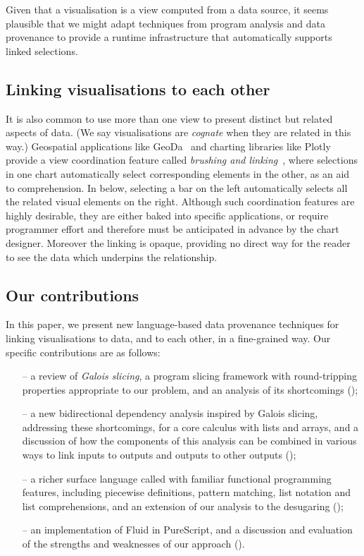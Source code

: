 Given that a visualisation is a view computed from a data source, it seems plausible that we might adapt techniques from program analysis and data provenance to provide a runtime infrastructure that automatically supports linked selections.

\subsection{Linking visualisations to each other}

It is also common to use more than one view to present distinct but related aspects of data. (We say visualisations are \emph{cognate} when they are related in this way.) Geospatial applications like GeoDa~\cite{anselin06} and charting libraries like Plotly provide a view coordination feature called \emph{brushing and linking}~\cite{becker87}, where selections in one chart automatically select corresponding elements in the other, as an aid to comprehension. In  below, selecting a bar on the left automatically selects all the related visual elements on the right. Although such coordination features are highly desirable, they are either baked into specific applications, or require programmer effort and therefore must be anticipated in advance by the chart designer. Moreover the linking is opaque, providing no direct way for the reader to see the data which underpins the relationship.

\subsection{Our contributions}

In this paper, we present new language-based data provenance techniques for linking visualisations to data, and to each other, in a fine-grained way. Our specific contributions are as follows:

\begin{itemize}[leftmargin=*]
   \item[--] a review of \emph{Galois slicing}, a program slicing framework with round-tripping properties appropriate to our problem, and an analysis of its shortcomings ();
   \item[--] a new bidirectional dependency analysis inspired by Galois slicing, addressing these shortcomings, for a core calculus with lists and arrays, and a discussion of how the components of this analysis can be combined in various ways to link inputs to outputs and outputs to other outputs ();
   \item[--] a richer surface language called \OurLanguage with familiar functional programming features, including piecewise definitions, pattern matching, list notation and list comprehensions, and an extension of our analysis to the desugaring ();
   \item[--] an implementation of Fluid in PureScript, and a discussion and evaluation of the strengths and weaknesses of our approach ().
\end{itemize}
